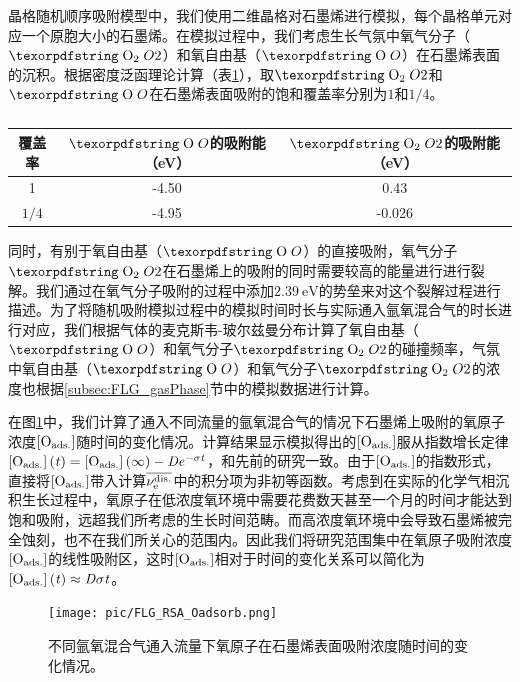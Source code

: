 晶格随机顺序吸附模型中，我们使用二维晶格对石墨烯进行模拟，每个晶格单元对应一个原胞大小的石墨烯。在模拟过程中，我们考虑生长气氛中氧气分子（$\cemb{O2}$）和氧自由基（$\cemb{O}$）在石墨烯表面的沉积。根据密度泛函理论计算（表\ref{tab:FLG_RSA_coverage}），取$\cemb{O2}$和$\cemb{O}$在石墨烯表面吸附的饱和覆盖率分别为$1$和$1 / 4$。

\begin{table}
    \centering
    \caption{}
    \begin{tabular}{ccc}
        \toprule
        覆盖率  & $\cemb{O}$的吸附能（\si{\electronvolt}） & $\cemb{O2}$的吸附能（\si{\electronvolt}） \\
        \midrule
        1       & -4.50                                    & 0.43                                      \\
        $1 / 4$ & -4.95                                    & -0.026                                    \\
        \bottomrule
    \end{tabular}
    \label{tab:FLG_RSA_coverage}
\end{table}

同时，有别于氧自由基（$\cemb{O}$）的直接吸附，氧气分子$\cemb{O2}$在石墨烯上的吸附的同时需要较高的能量进行进行裂解。我们通过在氧气分子吸附的过程中添加$\SI{2.39}{\electronvolt}$的势垒来对这个裂解过程进行描述。为了将随机吸附模拟过程中的模拟时间时长与实际通入氩氧混合气的时长进行对应，我们根据气体的麦克斯韦-玻尔兹曼分布计算了氧自由基（$\cemb{O}$）和氧气分子$\cemb{O2}$的碰撞频率，气氛中氧自由基（$\cemb{O}$）和氧气分子$\cemb{O2}$的浓度也根据\ref{subsec:FLG_gasPhase}节中的模拟数据进行计算。

在图\ref{fig:FLG_RSA_Oadsorb}中，我们计算了通入不同流量的氩氧混合气的情况下石墨烯上吸附的氧原子浓度$\rm{\left[O_{ads.}\right]} \it$随时间的变化情况。计算结果显示模拟得出的$\rm{\left[O_{ads.}\right]} \it$服从指数增长定律$\rm{\left[O_{ads.}\right]} \it\left(\it t\right)=\rm{\left[O_{ads.}\right]} \it\left(\it \infty \right)-\it De^{\it -\sigma t}$，和先前的研究一致。由于$\rm{\left[O_{ads.}\right]} \it$的指数形式，直接将$\rm{\left[O_{ads.}\right]} \it$带入计算$\overline{\it \nu_{\rm e}^{\rm dis.} \it}$中的积分项为非初等函数。考虑到在实际的化学气相沉积生长过程中，氧原子在低浓度氧环境中需要花费数天甚至一个月的时间才能达到饱和吸附，远超我们所考虑的生长时间范畴。而高浓度氧环境中会导致石墨烯被完全蚀刻，也不在我们所关心的范围内。因此我们将研究范围集中在氧原子吸附浓度$\rm{\left[O_{ads.}\right]} \it$的线性吸附区，这时$\rm{\left[O_{ads.}\right]} \it$相对于时间的变化关系可以简化为$\rm{\left[O_{ads.}\right]} \it\left(\it t\right)\approx \it D \sigma t$。

\begin{figure}[htb]
    \texttt{[image: pic/FLG\_RSA\_Oadsorb.png]}
    \caption{不同氩氧混合气通入流量下氧原子在石墨烯表面吸附浓度随时间的变化情况。}
    \label{fig:FLG_RSA_Oadsorb}
\end{figure}

